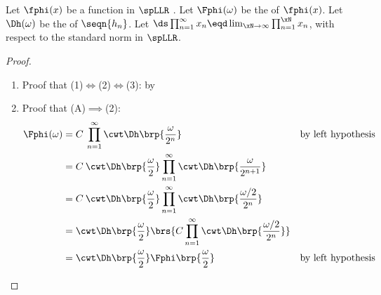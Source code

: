 \begin{lemma}
\label{lem:Fphi_infty}
Let $\fphi(x)$ be a function in $\spLLR$ .
Let $\Fphi(\omega)$ be the of $\fphi(x)$.
Let $\Dh(\omega)$ be the  of $\seqn{h_n}$.
Let $\ds\prod_{n=1}^\infty x_n \eqd \lim_{\xN\to\infty}\prod_{n=1}^\xN x_n$, with respect to the standard norm in $\spLLR$.

\end{lemma}
\begin{proof}
  \begin{enumerate}
    \item Proof that (1)$\iff$(2)$\iff$(3): by 
    \item Proof that (A)$\implies$(2):
      \begin{align*}
        \Fphi(\omega)
          &= C\:\prod_{n=1}^{\infty} \cwt \Dh\brp{\frac{\omega}{2^n}}
          && \text{by left hypothesis}
        \\&= C\:\cwt \Dh\brp{\frac{\omega}{2}} \prod_{n=1}^{\infty} \cwt \Dh\brp{\frac{\omega}{2^{n+1}}}
        \\&= C\:\cwt \Dh\brp{\frac{\omega}{2}} \prod_{n=1}^{\infty} \cwt \Dh\brp{\frac{\omega/2}{2^{n}}}
        \\&= \cwt \Dh\brp{\frac{\omega}{2}}\brs{C\prod_{n=1}^{\infty} \cwt \Dh\brp{\frac{\omega/2}{2^{n}}}}
        \\&= \cwt \Dh\brp{\frac{\omega}{2}} \Fphi\brp{\frac{\omega}{2}}
          && \text{by left hypothesis}
      \end{align*}
  \end{enumerate}
\end{proof}


